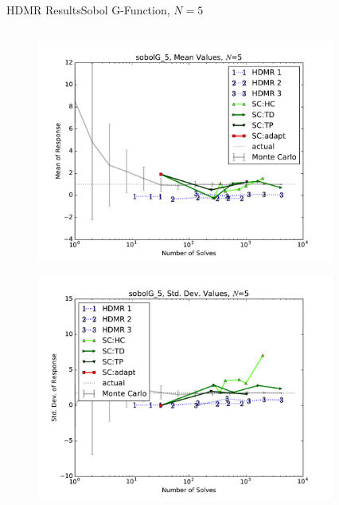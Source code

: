 \documentclass{beamer}
\begin{document}
\begin{frame}{HDMR Results}{Sobol G-Function, $N=5$}\vspace{-20pt}
 \begin{columns}
   \begin{column}{0.5\textwidth}
        \begin{figure}[h!]
          \centering
          \includegraphics[width=0.8\linewidth]{anlmodels/sobolG_5_mean_vals}
        \end{figure}
        \vspace{-20pt}
        \begin{figure}[h!]
          \centering
          \includegraphics[width=0.8\linewidth]{anlmodels/sobolG_5_var_vals}
        \end{figure}
   \end{column}
   \begin{column}{0.5\textwidth}
        \begin{figure}[h!]
          \centering

\end{figure}
\end{column}
\end{columns}
\end{frame}
\end{document}
